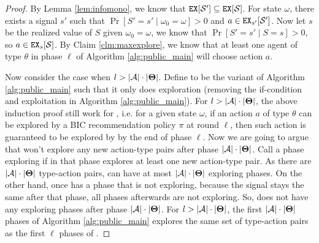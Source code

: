 \begin{proof}
By Lemma \ref{lem:infomono}, we know that $\mathtt{EX}[\mathcal{S}'] \subseteq \mathtt{EX}[\mathcal{S}]$. For state $\omega$, there exists a signal $s'$ such that $\Pr[S'=s'\mid \omega_0 =\omega] >0 $ and $a \in \mathtt{EX}_{s'} [\mathcal{S}']$. Now let $s$ be the realized value of $S$ given $\omega_0 = \omega$, we know that $\Pr[S'=s'\mid S=s] >0$, so $a \in \mathtt{EX}_s[\mathcal{S}]$. By Claim \ref{clm:maxexplore}, we know that at least one agent of type $\theta$ in phase $\ell$ of Algorithm \ref{alg:public_main} will choose action $a$.

Now consider the case when $l > |\mathcal{A}| \cdot |\bold{\Theta}|$. Define \ALG to be the variant of Algorithm \ref{alg:public_main} such that it only does exploration (removing the if-condition and exploitation in Algorithm \ref{alg:public_main}). For $l > |\mathcal{A}| \cdot |\bold{\Theta}|$, the above induction proof still work for \ALG, i.e. for a given state $\omega$, if an action $a$ of type $\theta$ can be explored by a BIC recommendation policy $\pi$ at round $\ell$, then such action is guaranteed to be explored by \ALG by the end of phase $\ell$. Now we are going to argue that \ALG won't explore any new action-type pairs after phase $|\mathcal{A}| \cdot |\bold{\Theta}|$. Call a phase exploring if in that phase \ALG explores at least one new action-type pair. As there are  $ |\mathcal{A}| \cdot |\bold{\Theta}|$ type-action pairs, \ALG can have at most $ |\mathcal{A}| \cdot |\bold{\Theta}|$ exploring phases. On the other hand, once \ALG has a phase that is not exploring, because the signal stays the same after that phase, all phases afterwards are not exploring. So, \ALG does not have any exploring phases after phase $|\mathcal{A}| \cdot |\bold{\Theta}|$. For $l > |\mathcal{A}| \cdot |\bold{\Theta}|$, the first $|   \mathcal{A}| \cdot |\bold{\Theta}|$ phases of Algorithm \ref{alg:public_main} explores the same set of type-action pairs as the first $\ell$ phases of \ALG.
\end{proof}

